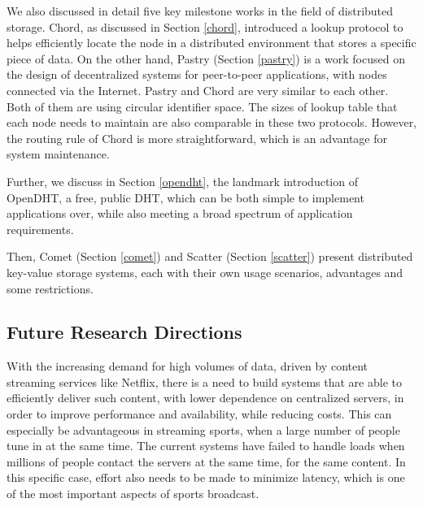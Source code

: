 \documentclass[11pt,a4paper]{article}
\begin{document}
    We also discussed in detail five key milestone works in the field of distributed storage. Chord, as discussed in Section \ref{chord}, introduced a lookup protocol to helps efficiently locate the node in a distributed environment that stores a specific piece of data. On the other hand, Pastry (Section \ref{pastry}) is a work focused on the design of decentralized systems for peer-to-peer applications, with nodes connected via the Internet. Pastry and Chord are very similar to each other. Both of them are using circular identifier space. The sizes of lookup table that each node needs to maintain are also comparable in these two protocols. However, the routing rule of Chord is more straightforward, which is an advantage for system maintenance.
    
    Further, we discuss in Section \ref{opendht}, the landmark introduction of OpenDHT, a free, public DHT, which can be both simple to implement applications over, while also meeting a broad spectrum of application requirements.
    
    Then, Comet (Section \ref{comet}) and Scatter (Section \ref{scatter}) present distributed key-value storage systems, each with their own usage scenarios, advantages and some restrictions.
    
    \subsection{Future Research Directions}
    
    With the increasing demand for high volumes of data, driven by content streaming services like Netflix, there is a need to build systems that are able to efficiently deliver such content, with lower dependence on centralized servers, in order to improve performance and availability, while reducing costs. This can especially be advantageous in streaming sports, when a large number of people tune in at the same time. The current systems have failed to handle loads when millions of people contact the servers at the same time, for the same content. In this specific case, effort also needs to be made to minimize latency, which is one of the most important aspects of sports broadcast.
    
    
    
    
\end{document}
